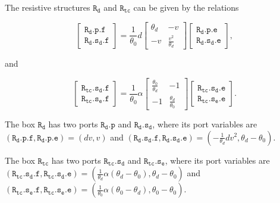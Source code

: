 \documentclass[
	parskip, 			   %
	twoside, 			   %
	DIV=14, 			   %
	BCOR=15.0mm, 		   %
	headsepline, 		   %
	open=right, 		   %
	captions=tableheading, %
	bibliography=totoc,    %
	numbers=noenddot       %
]{scrreprt}
\begin{document}
The resistive structures $\mathtt{R_d}$ and $\mathtt{R_{tc}}$ can be given by the relations

\begin{equation}
    \label{eq:resistive_structure_damping_interconnection_ndho}
    \left[\begin{array}{l}\mathtt{R_{d}.p.f} \\ \mathtt{R_{d}.s_{d}.f}\end{array}\right]=\frac{1}{\theta_0} d\left[\begin{array}{rr}\theta_d & -v \\ -v & \frac{v^2}{\theta_d}\end{array}\right]\left[\begin{array}{l}\mathtt{R_{d}.p.e} \\ \mathtt{R_{d}.s_{d}.e}\end{array}\right],
\end{equation}

and

\begin{equation}
    \label{eq:resistive_structure_thermal_conduction_interconnection_ndho}
    \left[\begin{array}{l}\mathtt{R_{tc}.s_{d}.f} \\ \mathtt{R_{tc}.s_{e}.f}\end{array}\right]=\frac{1}{\theta_0} \alpha \left[\begin{array}{rr} \frac{\theta_0}{\theta_d} & -1 \\ -1 & \frac{\theta_d}{\theta_0}\end{array}\right]\left[\begin{array}{l}\mathtt{R_{tc}.s_{d}.e} \\ \mathtt{R_{tc}.s_{e}.e}\end{array}\right].
\end{equation}

The box $\mathtt{R_d}$ has two ports $\mathtt{R_{d}.p}$ and $\mathtt{R_{d}.s_{d}}$, where its port variables are $(\mathtt{R_{d}.p.f}, \mathtt{R_{d}.p.e}) = (dv, v)$ and $(\mathtt{R_{d}.s_{d}.f}, \mathtt{R_{d}.s_{d}.e}) = (-\frac{1}{\theta_d}dv^2, \theta_d - \theta_0)$.

The box $\mathtt{R_{tc}}$ has two ports $\mathtt{R_{tc}.s_{d}}$ and $\mathtt{R_{tc}.s_{e}}$, where its port variables are $(\mathtt{R_{tc}.s_{d}.f}, \mathtt{R_{tc}.s_{d}.e}) = (\frac{1}{\theta_d}\alpha(\theta_d-\theta_0), \theta_d-\theta_0)$ and $(\mathtt{R_{tc}.s_{e}.f}, \mathtt{R_{tc}.s_{e}.e}) = (\frac{1}{\theta_0}\alpha(\theta_0-\theta_d), \theta_0-\theta_0)$.
\end{document}
